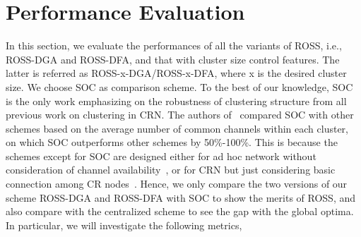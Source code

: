 \documentclass[10pt,journal,compsoc]{IEEEtran}
\theoremstyle{mytheoremstyle}
\theoremstyle{mytheoremstyle}
\theoremstyle{mytheoremstyle}
\newcommand{\ie}{i.e., }
\begin{document}
 





\section{Performance Evaluation}
\label{performance}
In this section, we evaluate the performances of all the variants of ROSS, \ie ROSS-DGA and ROSS-DFA, and that with cluster size control features.
The latter is referred as ROSS-x-DGA/ROSS-x-DFA, where x is the desired cluster size.
We choose SOC as comparison scheme.
To the best of our knowledge, SOC~\cite{Lazos09} is the only work emphasizing on the robustness of clustering structure from all previous work on clustering in CRN. The authors of~\cite{Lazos09} compared SOC with other schemes based on the average number of common channels within each cluster, on which SOC outperforms other schemes by 50\%-100\%. This is because the schemes except for SOC are designed either for ad hoc network without consideration of channel availability~\cite{Basagni99}, or for CRN  but just considering basic connection among CR nodes~\cite{Zhao07}. Hence, we only compare the two versions of our scheme ROSS-DGA and ROSS-DFA with SOC to show the merits of ROSS, and also compare with the centralized scheme to see the gap with the global optima. 
In particular, we will investigate the following metrics,
\end{document}
